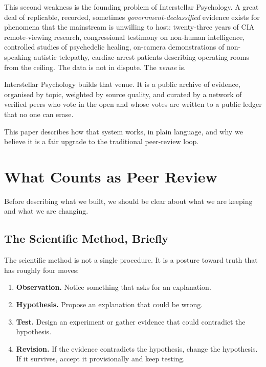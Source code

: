 \documentclass[11pt,a4paper]{article}
\begin{document}
This second weakness is the founding problem of Interstellar Psychology.
A great deal of replicable, recorded, sometimes \emph{government-declassified}
evidence exists for phenomena that the mainstream is unwilling to host:
twenty-three years of CIA remote-viewing research, congressional
testimony on non-human intelligence, controlled studies of psychedelic
healing, on-camera demonstrations of non-speaking autistic telepathy,
cardiac-arrest patients describing operating rooms from the ceiling.
The data is not in dispute. The \emph{venue} is.

Interstellar Psychology builds that venue. It is a public archive of
evidence, organised by topic, weighted by source quality, and curated
by a network of verified peers who vote in the open and whose votes
are written to a public ledger that no one can erase.

This paper describes how that system works, in plain language, and
why we believe it is a fair upgrade to the traditional peer-review loop.

\section{What Counts as Peer Review}

Before describing what we built, we should be clear about what we
are keeping and what we are changing.

\subsection{The Scientific Method, Briefly}

The scientific method is not a single procedure. It is a posture toward
truth that has roughly four moves:

\begin{enumerate}[leftmargin=1.5em]
  \item \textbf{Observation.} Notice something that asks for an explanation.
  \item \textbf{Hypothesis.} Propose an explanation that could be wrong.
  \item \textbf{Test.} Design an experiment or gather evidence that could
        contradict the hypothesis.
  \item \textbf{Revision.} If the evidence contradicts the hypothesis,
        change the hypothesis. If it survives, accept it provisionally
        and keep testing.
\end{enumerate}
\end{document}

